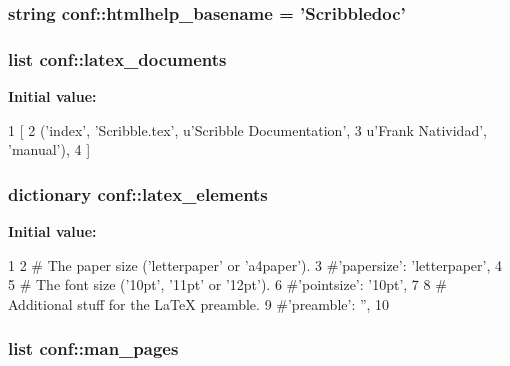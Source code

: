 \hypertarget{namespaceconf_a74d707b34bba474e9057f383ad01de83}{
\subsubsection[{htmlhelp\-\_\-basename}]{\setlength{\rightskip}{0pt plus 5cm}string {\bf conf\-::htmlhelp\-\_\-basename} = '\-Scribbledoc'}}\label{namespaceconf_a74d707b34bba474e9057f383ad01de83}
\hypertarget{namespaceconf_a00b7896473527f894006130b1113cb4b}{
\subsubsection[{latex\-\_\-documents}]{\setlength{\rightskip}{0pt plus 5cm}list {\bf conf\-::latex\-\_\-documents}}}\label{namespaceconf_a00b7896473527f894006130b1113cb4b}
{\bfseries \-Initial value\-:}
\begin{DoxyCode}
1 [
2   ('index', 'Scribble.tex', u'Scribble Documentation',
3    u'Frank Natividad', 'manual'),
4 ]
\end{DoxyCode}
\hypertarget{namespaceconf_a82b98d5b4f4b8dee5476fb983fd85407}{
\subsubsection[{latex\-\_\-elements}]{\setlength{\rightskip}{0pt plus 5cm}dictionary {\bf conf\-::latex\-\_\-elements}}}\label{namespaceconf_a82b98d5b4f4b8dee5476fb983fd85407}
{\bfseries \-Initial value\-:}
\begin{DoxyCode}
1 {
2 # The paper size ('letterpaper' or 'a4paper').
3 #'papersize': 'letterpaper',
4 
5 # The font size ('10pt', '11pt' or '12pt').
6 #'pointsize': '10pt',
7 
8 # Additional stuff for the LaTeX preamble.
9 #'preamble': '',
10 }
\end{DoxyCode}
\hypertarget{namespaceconf_a45cae4ca704c12a150b112eb1b66d0b1}{
\subsubsection[{man\-\_\-pages}]{\setlength{\rightskip}{0pt plus 5cm}list {\bf conf\-::man\-\_\-pages}}}\label{namespaceconf_a45cae4ca704c12a150b112eb1b66d0b1}
